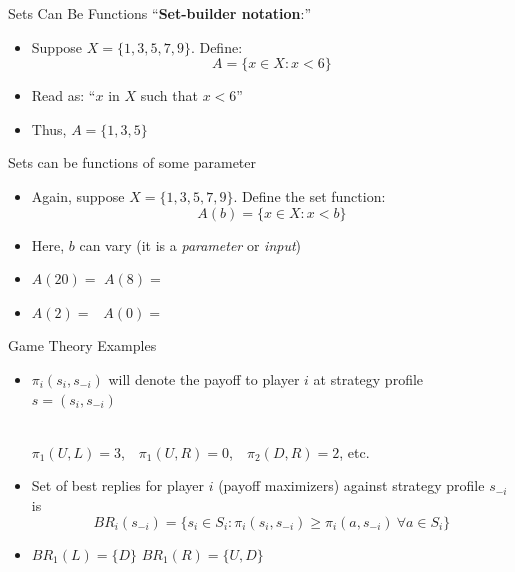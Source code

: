 \begin{frame}{Sets Can Be Functions}
``\textbf{Set-builder notation}:''
\begin{itemize}
    \item Suppose $X = \{1,3,5,7,9\}$. Define:
    $$
        A = \{x\in X: x<6\}
    $$
    \item Read as: ``$x$ in $X$ such that $x<6$''
    \item Thus, $A=\{1,3,5\}$
\end{itemize}
\bsk
Sets can be functions of some parameter
\begin{itemize}
    \item Again, suppose $X=\{1,3,5,7,9\}$. Define the set function:
    $$
        A(b) = \{x\in X : x < b\}
    $$
    \item Here, $b$ can vary (it is a \textit{parameter} or \textit{input})
    \item $A(20) =$ \hspace{2in} $A(8) = $
    \item $A(2) =\ \  $ \hspace{2in} $A(0) = $    
\end{itemize}
\end{frame}

\begin{frame}{Game Theory Examples}
\begin{itemize}
    \item $\pi_i(s_i,s_{-i})$ will denote the payoff to player $i$ at strategy profile $s=(s_i,s_{-i})$\\
    \begin{matrixgame}[player names={Player 1,Player 2}, top={U, D}, left={L, R}]
    \end{matrixgame}\\
    $\pi_1(U,L) = 3$,\ \ $\pi_1(U,R)=0$,\ \ $\pi_2(D,R)=2$, etc.
    \bsk
    \item Set of best replies for player $i$ (payoff maximizers) against strategy profile $s_{-i}$ is\\
    $$
        BR_i(s_{-i}) = \{s_i\in S_i : \pi_i(s_i,s_{-i}) \geq \pi_i(a,s_{-i})\ \forall a\in S_i \}
    $$
    \bsk
    \bsk
    \item $BR_1(L)=\{D\}$ \hspace{2in} $BR_1(R)=\{U,D\}$
    
\end{itemize}
    
\end{frame}


